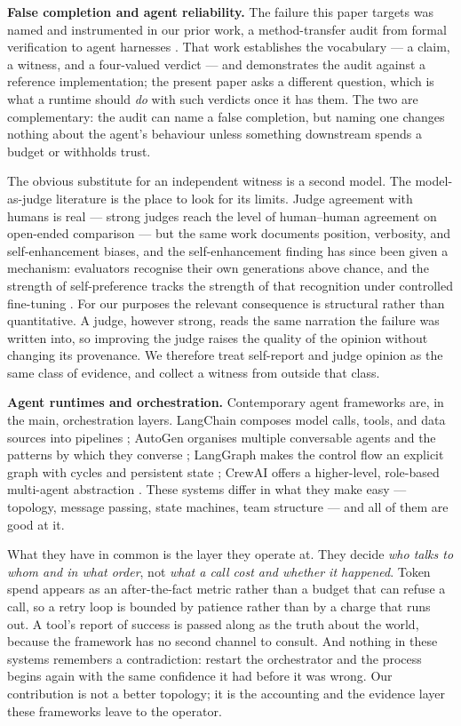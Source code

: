 \documentclass[conference]{IEEEtran}
\begin{document}
\textbf{False completion and agent reliability.}
The failure this paper targets was named and instrumented in our prior work, a
method-transfer audit from formal verification to agent harnesses
\cite{liaozhizhi2026methodtransfer}. That work establishes the vocabulary --- a
claim, a witness, and a four-valued verdict --- and demonstrates the audit against
a reference implementation; the present paper asks a different question, which is
what a runtime should \emph{do} with such verdicts once it has them. The two are
complementary: the audit can name a false completion, but naming one changes
nothing about the agent's behaviour unless something downstream spends a budget or
withholds trust.

The obvious substitute for an independent witness is a second model. The
model-as-judge literature is the place to look for its limits. Judge agreement
with humans is real --- strong judges reach the level of human--human agreement on
open-ended comparison \cite{zheng2023judging} --- but the same work documents
position, verbosity, and self-enhancement biases, and the self-enhancement finding
has since been given a mechanism: evaluators recognise their own generations above
chance, and the strength of self-preference tracks the strength of that
recognition under controlled fine-tuning \cite{panickssery2024evaluators}. For our
purposes the relevant consequence is structural rather than quantitative. A judge,
however strong, reads the same narration the failure was written into, so
improving the judge raises the quality of the opinion without changing its
provenance. We therefore treat self-report and judge opinion as the same class of
evidence, and collect a witness from outside that class.

\textbf{Agent runtimes and orchestration.}
Contemporary agent frameworks are, in the main, orchestration layers. LangChain
composes model calls, tools, and data sources into pipelines
\cite{chase2022langchain}; AutoGen organises multiple conversable agents and the
patterns by which they converse \cite{wu2024autogen}; LangGraph makes the control
flow an explicit graph with cycles and persistent state
\cite{langchain2024langgraph}; CrewAI offers a higher-level, role-based
multi-agent abstraction \cite{moura2024crewai}. These systems differ in what they
make easy --- topology, message passing, state machines, team structure --- and
all of them are good at it.

What they have in common is the layer they operate at. They decide \emph{who talks
to whom and in what order}, not \emph{what a call cost and whether it happened}.
Token spend appears as an after-the-fact metric rather than a budget that can
refuse a call, so a retry loop is bounded by patience rather than by a charge that
runs out. A tool's report of success is passed along as the truth about the world,
because the framework has no second channel to consult. And nothing in these
systems remembers a contradiction: restart the orchestrator and the process
begins again with the same confidence it had before it was wrong. Our contribution
is not a better topology; it is the accounting and the evidence layer these
frameworks leave to the operator.
\end{document}
